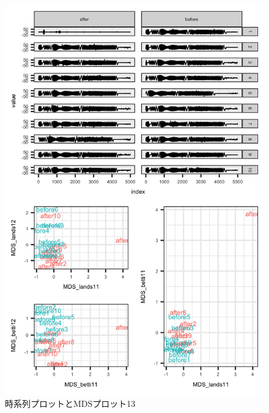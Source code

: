 \documentclass{jarticle}
\begin{document}
\begin{figure}[H]
	\begin{center}
		\includegraphics[width=15cm]{fig/MDS_plot13.png}
		\caption{時系列プロットとMDSプロット13}
		\label{fig:MDS_plot13}
	\end{center}
\end{figure}
\end{document}
